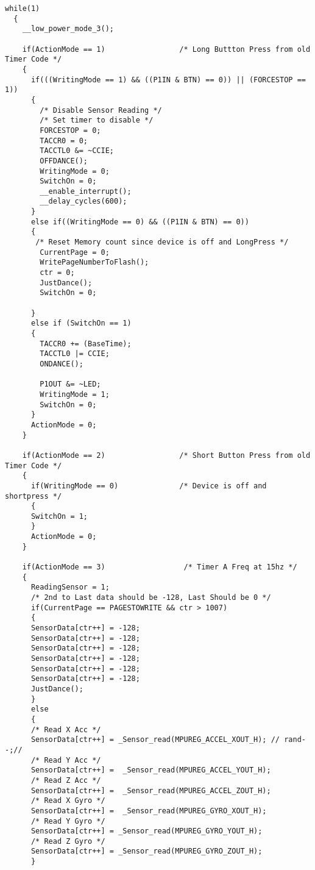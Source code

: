 \begin{lstlisting}[caption=Main.c,label=Code4]
  while(1)
  {
    __low_power_mode_3();
    
    if(ActionMode == 1)                 /* Long Buttton Press from old Timer Code */
    {
      if(((WritingMode == 1) && ((P1IN & BTN) == 0)) || (FORCESTOP == 1))
      {
        /* Disable Sensor Reading */
        /* Set timer to disable */
        FORCESTOP = 0;
        TACCR0 = 0;
        TACCTL0 &= ~CCIE;
        OFFDANCE();
        WritingMode = 0;
        SwitchOn = 0;
        __enable_interrupt();
        __delay_cycles(600);
      }
      else if((WritingMode == 0) && ((P1IN & BTN) == 0))
      {
       /* Reset Memory count since device is off and LongPress */
        CurrentPage = 0;               
        WritePageNumberToFlash();
        ctr = 0;
        JustDance();
        SwitchOn = 0;
        
      }
      else if (SwitchOn == 1)
      {
        TACCR0 += (BaseTime);
        TACCTL0 |= CCIE;
        ONDANCE();
        
        P1OUT &= ~LED;
        WritingMode = 1;
        SwitchOn = 0;
      }
      ActionMode = 0;  
    }
    
    if(ActionMode == 2)                 /* Short Button Press from old Timer Code */
    {
      if(WritingMode == 0)              /* Device is off and shortpress */
      {
      SwitchOn = 1;
      }
      ActionMode = 0;
    }    
    
    if(ActionMode == 3)                  /* Timer A Freq at 15hz */
    {
      ReadingSensor = 1;
      /* 2nd to Last data should be -128, Last Should be 0 */
      if(CurrentPage == PAGESTOWRITE && ctr > 1007) 
      {
      SensorData[ctr++] = -128;
      SensorData[ctr++] = -128;
      SensorData[ctr++] = -128;
      SensorData[ctr++] = -128;
      SensorData[ctr++] = -128;
      SensorData[ctr++] = -128;
      JustDance();
      }
      else
      {
      /* Read X Acc */
      SensorData[ctr++] = _Sensor_read(MPUREG_ACCEL_XOUT_H); // rand--;//
      /* Read Y Acc */
      SensorData[ctr++] =  _Sensor_read(MPUREG_ACCEL_YOUT_H);
      /* Read Z Acc */
      SensorData[ctr++] =  _Sensor_read(MPUREG_ACCEL_ZOUT_H);
      /* Read X Gyro */
      SensorData[ctr++] =  _Sensor_read(MPUREG_GYRO_XOUT_H);
      /* Read Y Gyro */
      SensorData[ctr++] = _Sensor_read(MPUREG_GYRO_YOUT_H);
      /* Read Z Gyro */
      SensorData[ctr++] = _Sensor_read(MPUREG_GYRO_ZOUT_H);
      }
      


\end{lstlisting}
